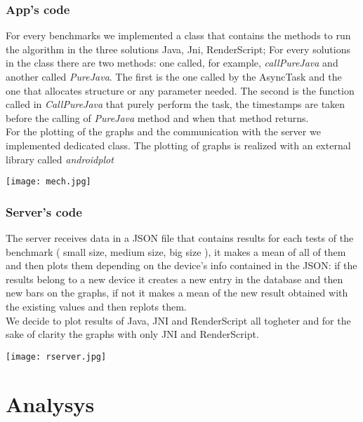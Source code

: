 \documentclass[11pt,english]{article}
\begin{document}
\subsubsection{App's code}
For every benchmarks we implemented a class that contains the methods to run the algorithm in the three solutions Java, Jni, RenderScript; For every solutions in the class there are two methods: one called, for example, \textit{callPureJava} and another called \textit{PureJava}. The first is the one called by the AsyncTask and the one that allocates structure or any parameter needed. The second is the function called in \textit{CallPureJava} that purely perform the task, the timestamps are taken before the calling of \textit{PureJava} method and when that method returns.\\
For the plotting of the graphs and the communication with the server we implemented dedicated class. The plotting of graphs is realized with an external library called \textit{androidplot}\cite{plot}
\begin{center}
\texttt{[image: mech.jpg]}
\end{center} 
\subsubsection{Server's code}
The server receives data in a JSON file that contains results for each tests of the benchmark ( small size, medium size, big size ), it makes a mean of all of them and then plots them depending on the device's info contained in the JSON: if the results belong to a new device it creates a new entry in the database and then new bars on the graphs, if not it makes a mean of the new result obtained with the existing values and then replots them.\\We decide to plot results of Java, JNI and RenderScript all togheter and for the sake of clarity the graphs with only JNI and RenderScript.
\begin{center}
\texttt{[image: rserver.jpg]}
\end{center} 
\section{Analysys}
\end{document}

